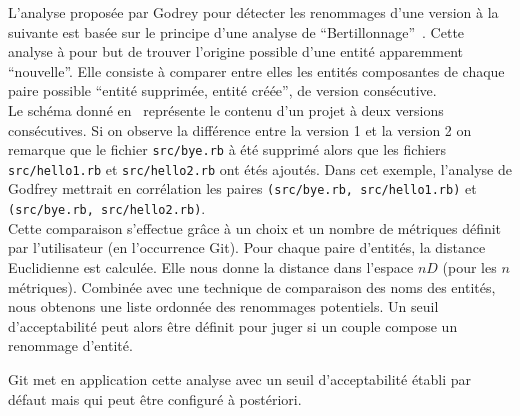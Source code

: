 L'analyse proposée par Godrey pour détecter les renommages d'une version à la suivante est basée sur le principe d'une analyse de ``Bertillonnage''~\cite{bertillonnage}. Cette analyse à pour but de trouver l’origine possible d’une entité apparemment ``nouvelle''. Elle consiste à comparer entre elles les entités composantes de chaque paire possible ``entité supprimée, entité créée'', de version consécutive.\\ 

Le schéma donné en~ représente le contenu d'un projet à deux versions consécutives. Si on observe la différence entre la version 1 et la version 2 on remarque que le fichier \texttt{src/bye.rb} à été supprimé alors que les fichiers \texttt{src/hello1.rb} et \texttt{src/hello2.rb} ont étés ajoutés.
Dans cet exemple, l'analyse de Godfrey mettrait en corrélation les paires \texttt{(src/bye.rb, src/hello1.rb)} et \texttt{(src/bye.rb, src/hello2.rb)}.\\  

Cette comparaison s'effectue grâce à un choix et un nombre de métriques définit par l'utilisateur (en l'occurrence Git). Pour chaque paire d'entités, la distance Euclidienne est calculée. Elle nous donne la distance dans l’espace $nD$ (pour les $n$ métriques). Combinée avec une technique de comparaison des noms des entités, nous obtenons une liste ordonnée des renommages potentiels. Un seuil d'acceptabilité peut alors être définit pour juger si un couple compose un renommage d'entité.

Git met en application cette analyse avec un seuil d'acceptabilité établi par défaut mais qui peut être configuré à postériori.\\



